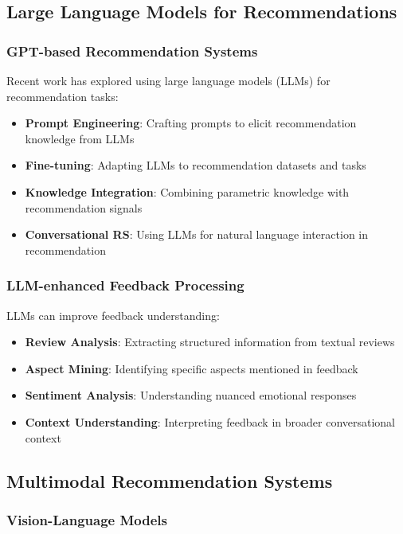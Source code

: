 \subsection{Large Language Models for Recommendations}

\subsubsection{GPT-based Recommendation Systems}

Recent work has explored using large language models (LLMs) for recommendation tasks:

\begin{itemize}
    \item \textbf{Prompt Engineering}: Crafting prompts to elicit recommendation knowledge from LLMs
    \item \textbf{Fine-tuning}: Adapting LLMs to recommendation datasets and tasks
    \item \textbf{Knowledge Integration}: Combining parametric knowledge with recommendation signals
    \item \textbf{Conversational RS}: Using LLMs for natural language interaction in recommendation
\end{itemize}

\subsubsection{LLM-enhanced Feedback Processing}

LLMs can improve feedback understanding:
\begin{itemize}
    \item \textbf{Review Analysis}: Extracting structured information from textual reviews
    \item \textbf{Aspect Mining}: Identifying specific aspects mentioned in feedback
    \item \textbf{Sentiment Analysis}: Understanding nuanced emotional responses
    \item \textbf{Context Understanding}: Interpreting feedback in broader conversational context
\end{itemize}

\subsection{Multimodal Recommendation Systems}

\subsubsection{Vision-Language Models}

